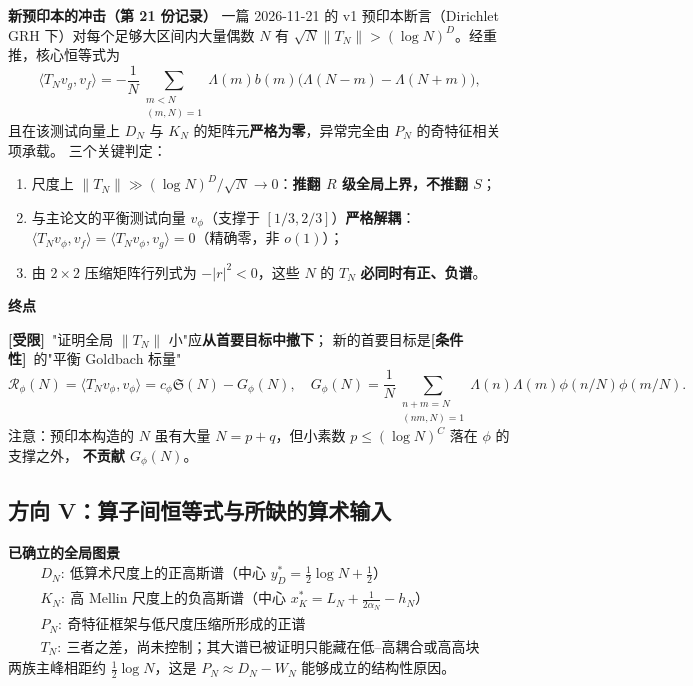\documentclass[11pt,a4paper]{ctexart}
\newcommand{\al}{\alpha_{N}}
\newcommand{\LN}{L_{N}}
\newcommand{\COND}{\textcolor{orange!85!black}{\textbf{[条件性]}}}
\newcommand{\BLOCK}{\textcolor{purple!80!black}{\textbf{[受限]}}}
\begin{document}
\textbf{新预印本的冲击（第 21 份记录）}
一篇 2026-11-21 的 v1 预印本断言（Dirichlet GRH 下）对每个足够大区间内大量偶数 $N$ 有
$\sqrt N\|T_N\|>(\log N)^D$。经重推，核心恒等式为
\begin{equation}\label{eq:preprint}
\langle T_Nv_g,v_f\rangle=-\frac{1}{N}\sum_{\substack{m<N\\(m,N)=1}}\Lambda(m)b(m)\bigl(\Lambda(N-m)-\Lambda(N+m)\bigr),
\end{equation}
且在该测试向量上 $D_N$ 与 $K_N$ 的矩阵元\textbf{严格为零}，异常完全由 $P_N$ 的奇特征相关项承载。
三个关键判定：
\begin{enumerate}[label=(\alph*)]
\item 尺度上 $\|T_N\|\gg(\log N)^D/\sqrt N\to0$：\textbf{推翻 $R$ 级全局上界，不推翻 $S$}；
\item 与主论文的平衡测试向量 $v_\phi$（支撑于 $[1/3,2/3]$）\textbf{严格解耦}：
$\langle T_Nv_\phi,v_f\rangle=\langle T_Nv_\phi,v_g\rangle=0$（精确零，非 $o(1)$）；
\item 由 $2\times2$ 压缩矩阵行列式为 $-|r|^2<0$，这些 $N$ 的 $T_N$ \textbf{必同时有正、负谱}。
\end{enumerate}

\textbf{终点}

\BLOCK\ "证明全局 $\|T_N\|$ 小"应\textbf{从首要目标中撤下}；
新的首要目标是\COND\ 的"平衡 Goldbach 标量"
\begin{equation}\label{eq:balanced}
\mathcal R_\phi(N)=\langle T_Nv_\phi,v_\phi\rangle=c_\phi\mathfrak S(N)-G_\phi(N),
\quad
G_\phi(N)=\frac1N\!\!\sum_{\substack{n+m=N\\(nm,N)=1}}\!\!\Lambda(n)\Lambda(m)\phi(n/N)\phi(m/N).
\end{equation}
注意：预印本构造的 $N$ 虽有大量 $N=p+q$，但小素数 $p\le(\log N)^C$ 落在 $\phi$ 的支撑之外，
\textbf{不贡献 $G_\phi(N)$}。

\subsection{方向 V：算子间恒等式与所缺的算术输入}

\textbf{已确立的全局图景}
\begin{equation}\label{eq:picture}
\boxed{
\begin{array}{c}
D_N:\ \text{低算术尺度上的正高斯谱（中心 } y_D^*=\tfrac12\log N+\tfrac12\text{）}\\[1mm]
K_N:\ \text{高 Mellin 尺度上的负高斯谱（中心 } x^*_{K}=\LN+\tfrac{1}{2\al}-h_N\text{）}\\[1mm]
P_N:\ \text{奇特征框架与低尺度压缩所形成的正谱}\\[1mm]
T_N:\ \text{三者之差，尚未控制；其大谱已被证明只能藏在低--高耦合或高高块}
\end{array}}
\end{equation}
两族主峰相距约 $\frac12\log N$，这是 $P_N\approx D_N-W_N$ 能够成立的结构性原因。
\end{document}
